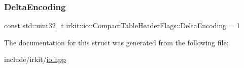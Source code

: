 \subsubsection{\texorpdfstring{Delta\+Encoding}{DeltaEncoding}}
{\footnotesize\ttfamily const std\+::uint32\+\_\+t irkit\+::io\+::\+Compact\+Table\+Header\+Flags\+::\+Delta\+Encoding = 1\hspace{0.3cm}{\ttfamily [static]}}



The documentation for this struct was generated from the following file\+:\begin{DoxyCompactItemize}
\item 
include/irkit/\mbox{\hyperlink{io_8hpp}{io.\+hpp}}\end{DoxyCompactItemize}
